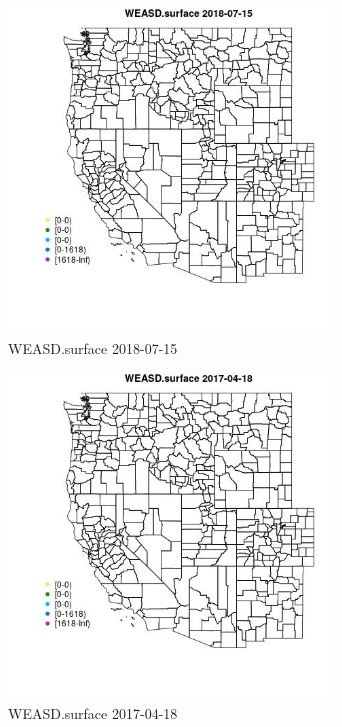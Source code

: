 \begin{figure} 
\centering  
\includegraphics[width=0.77\textwidth]{Code_Outputs/Report_ML_input_PM25_Step4_part_e_de_duplicated_aveswNAs_MapObsWEASDsurface2018-07-15.jpg} 
\caption{\label{fig:Report_ML_input_PM25_Step4_part_e_de_duplicated_aveswNAsMapObsWEASDsurface2018-07-15}WEASD.surface 2018-07-15} 
\end{figure} 
 

\begin{figure} 
\centering  
\includegraphics[width=0.77\textwidth]{Code_Outputs/Report_ML_input_PM25_Step4_part_e_de_duplicated_aveswNAs_MapObsWEASDsurface2017-04-18.jpg} 
\caption{\label{fig:Report_ML_input_PM25_Step4_part_e_de_duplicated_aveswNAsMapObsWEASDsurface2017-04-18}WEASD.surface 2017-04-18} 
\end{figure} 
 


